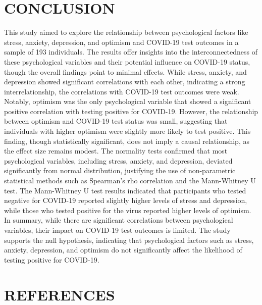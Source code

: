 \documentclass[a4paper]{article}
\begin{document}
\setlength{\textfloatsep}{50pt}
\section{CONCLUSION}
\vspace{0.5em}

\noindent
This study aimed to explore the relationship between psychological factors like stress, anxiety, depression, and optimism and COVID-19 test outcomes in a sample of 193 individuals.\newline
The results offer insights into the interconnectedness of these psychological variables and their potential influence on COVID-19 status, though the overall findings point to minimal effects.
\vspace{0.5em}\newline
While stress, anxiety, and depression showed significant correlations with each other, indicating a strong interrelationship, the correlations with COVID-19 test outcomes were weak.
Notably, optimism was the only psychological variable that showed a significant positive correlation with testing positive for COVID-19.
\vspace{0.5em}\newline
However, the relationship between optimism and COVID-19 test status was small, suggesting that individuals with higher optimism were slightly more likely to test positive.
This finding, though statistically significant, does not imply a causal relationship, as the effect size remains modest.
\vspace{0.5em}\newline
The normality tests confirmed that most psychological variables, including stress, anxiety, and depression, deviated significantly from normal distribution,
justifying the use of non-parametric statistical methods such as Spearman’s rho correlation and the Mann-Whitney U test.
The Mann-Whitney U test results indicated that participants who tested negative for COVID-19 reported slightly higher levels of stress and depression,
while those who tested positive for the virus reported higher levels of optimism.
\vspace{0.5em}\newline
In summary, while there are significant correlations between psychological variables, their impact on COVID-19 test outcomes is limited. The study supports the null hypothesis, indicating that psychological factors such as stress, anxiety, depression, and optimism do not significantly affect the likelihood of testing positive for COVID-19.

\newpage
\section{REFERENCES}



\end{document}
